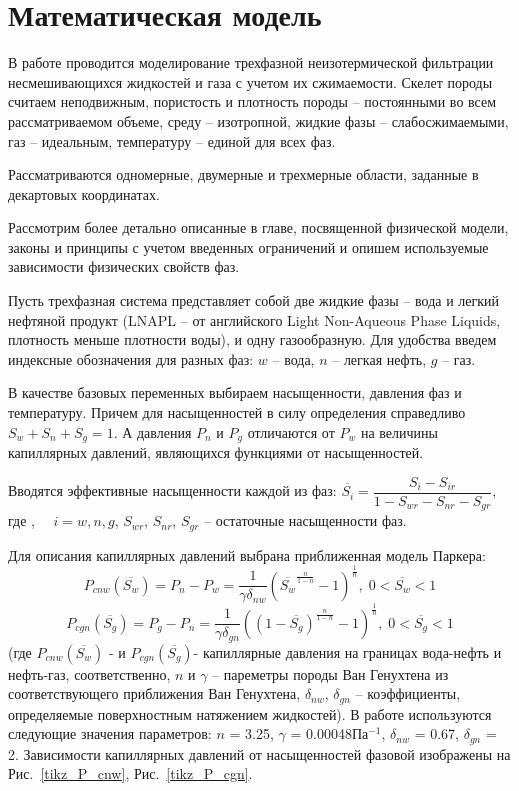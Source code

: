 %
\section{Математическая модель}
%
В работе проводится моделирование трехфазной неизотермической фильтрации 
несмешивающихся жидкостей и газа с учетом их сжимаемости. Скелет породы
считаем неподвижным, пористость и плотность породы -- постоянными во всем
рассматриваемом объеме, среду -- изотропной, жидкие фазы -- слабосжимаемыми,
газ -- идеальным, температуру -- единой для всех фаз.

Рассматриваются одномерные, двумерные и трехмерные
области, заданные в декартовых координатах.

Рассмотрим более детально описанные в главе, посвященной физической
модели, законы и принципы с учетом введенных ограничений и опишем
используемые зависимости физических свойств фаз.

Пусть трехфазная система представляет собой две жидкие фазы -- вода и легкий
нефтяной продукт (LNAPL -- от английского Light Non-Aqueous Phase Liquids,
плотность меньше плотности воды), и одну газообразную.
Для удобства введем индексные обозначения для разных фаз: $w$ -- вода, $n$ --
легкая нефть, $g$ -- газ.

В качестве базовых переменных выбираем насыщенности, давления фаз и температуру.
Причем для насыщенностей в силу определения справедливо  $S_w + S_n + S_g = 1$.
А давления $P_n$ и $P_g$ отличаются от $P_w$ на величины капиллярных
давлений, являющихся функциями от насыщенностей.

Вводятся эффективные насыщенности каждой из фаз:
$\overline{S_i}={\dfrac{S_i-S_{ir}}{1-S_{wr}-S_{nr}-S_{gr}}}$, где , ${\quad}i=w,n,g$, $S_{wr}$,
$S_{nr}$, $S_{gr}$ -- остаточные насыщенности фаз.

Для описания
капиллярных давлений выбрана приближенная модель Паркера\cite{Parker}:
$$P_{cnw}(\overline{S_w})=P_n-P_w={\frac{1}{\gamma \delta_{nw}}}
\left( \overline{S_w}^{\frac{n}{1-n}}-1 \right)^\frac{1}{n},\;0<\overline{S_w}<1 $$
$$P_{cgn}(\overline{S_g})=P_g-P_n={\frac{1}{\gamma \delta_{gn}}}
\left( (1-\overline{S_g})^{\frac{n}{1-n}}-1 \right)^\frac{1}{n},\;0<\overline{S_g}<1$$
(где $P_{cnw}(\overline{S_w})$ - и $P_{cgn}(\overline{S_g})$- капиллярные давления на границах вода-нефть и нефть-газ, 
соответственно, $n$ и $\gamma $ -- пареметры породы Ван Генухтена из соответствующего приближения
Ван Генухтена\cite{Genuchten}, $\delta_{nw}$, $\delta_{gn}$ -- коэффициенты, определяемые поверхностным натяжением 
жидкостей). В работе используются следующие значения параметров: $n$ = 3.25, $\gamma $ = 0.00048Па$^{-1}$,
$\delta_{nw}$ = 0.67, $\delta_{gn}$ = 2. Зависимости капиллярных давлений от насыщенностей фазовой
изображены на Рис.~\ref{tikz_P_cnw}, Рис.~\ref{tikz_P_cgn}.

